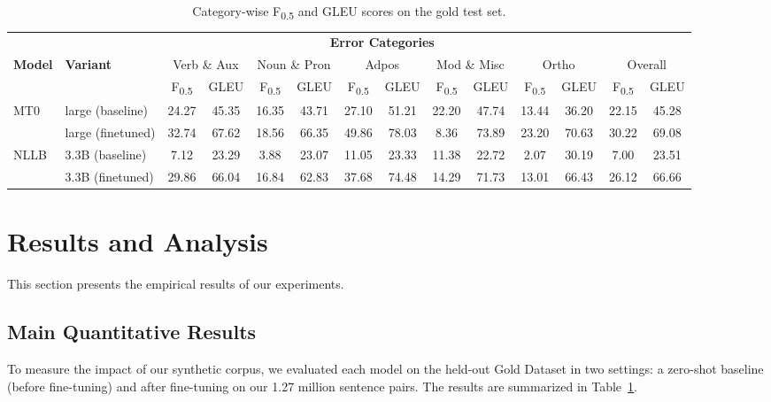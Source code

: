\documentclass[11pt]{article}
\begin{document}
\begin{table}[!t]
\centering
\scriptsize
\caption{Category-wise F\textsubscript{0.5} and GLEU scores on the gold test set.}
\label{tab:category_results}

\setlength{\tabcolsep}{3pt}
\renewcommand{\arraystretch}{1.1}

\begin{tabular}{l l cc cc cc cc cc cc}
\toprule
 &  & 
 \multicolumn{10}{c}{\textbf{Error Categories}} \\
\cmidrule(lr){3-12}

\textbf{Model} & \textbf{Variant} &
\multicolumn{2}{c}{Verb \& Aux} &
\multicolumn{2}{c}{Noun \& Pron} &
\multicolumn{2}{c}{Adpos} &
\multicolumn{2}{c}{Mod \& Misc} &
\multicolumn{2}{c}{Ortho} &
\multicolumn{2}{c}{Overall} \\

\cmidrule(lr){3-4}
\cmidrule(lr){5-6}
\cmidrule(lr){7-8}
\cmidrule(lr){9-10}
\cmidrule(lr){11-12}
\cmidrule(lr){13-14}

 &  &
F\textsubscript{0.5} & GLEU &
F\textsubscript{0.5} & GLEU &
F\textsubscript{0.5} & GLEU &
F\textsubscript{0.5} & GLEU &
F\textsubscript{0.5} & GLEU &
F\textsubscript{0.5} & GLEU \\
\midrule


MT0 
    & large (baseline)
 & 24.27 & 45.35 & 16.35 & 43.71 & 27.10 & 51.21 & 22.20 & 47.74 & 13.44 & 36.20 & 22.15 & 45.28 \\    
    & large (finetuned)
 & 32.74 & 67.62 & 18.56 & 66.35 & 49.86 & 78.03 & 8.36 & 73.89 & 23.20 & 70.63 & 30.22 & 69.08 \\

\addlinespace

NLLB
     & 3.3B (baseline)
 & 7.12 & 23.29 & 3.88 & 23.07 & 11.05 & 23.33 & 11.38 & 22.72 & 2.07 & 30.19 & 7.00 & 23.51 \\
     & 3.3B (finetuned)
 & 29.86 & 66.04 & 16.84 & 62.83 & 37.68 & 74.48 & 14.29 & 71.73 & 13.01 & 66.43 & 26.12 & 66.66 \\

\bottomrule
\end{tabular}
\end{table}


\section{Results and Analysis}
This section presents the empirical results of our experiments. 

\subsection{Main Quantitative Results}
To measure the impact of our synthetic corpus, we evaluated each model on the held-out Gold Dataset in two settings: a zero-shot baseline (before fine-tuning) and after fine-tuning on our 1.27 million sentence pairs. The results are summarized in Table~\ref {tab:category_results}.
\end{document}
